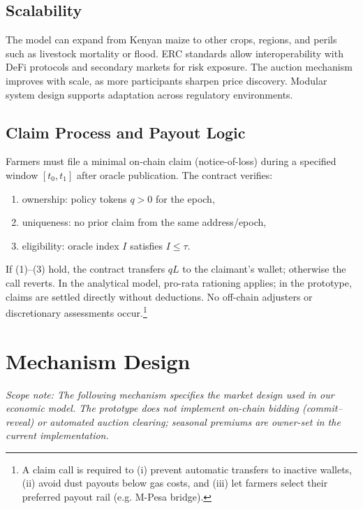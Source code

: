 \documentclass[11pt,a4paper]{article}
\begin{document}
        \subsection{Scalability}\label{subsec:scalability}
        The model can expand from Kenyan maize to other crops, regions, and perils such as livestock mortality or flood.
        ERC standards allow interoperability with DeFi protocols and secondary markets for risk exposure.
        The auction mechanism improves with scale, as more participants sharpen price discovery.
        Modular system design supports adaptation across regulatory environments.

        \subsection{Claim Process and Payout Logic}\label{subsec:claim-process-and-payout-logic}
        Farmers must file a minimal on-chain claim (notice-of-loss) during a specified window $[t_0,t_1]$ after oracle publication.
        The contract verifies:
        \begin{enumerate}
            \item ownership: policy tokens $q>0$ for the epoch,
            \item uniqueness: no prior claim from the same address/epoch,
            \item eligibility: oracle index $I$ satisfies $I \le \tau$.
        \end{enumerate}
        If (1)--(3) hold, the contract transfers $qL$ to the claimant’s wallet; otherwise the call reverts.
        In the analytical model, pro-rata rationing applies; in the prototype, claims are settled directly without deductions.
        No off-chain adjusters or discretionary assessments occur.\footnote{A claim call is required to (i) prevent automatic transfers to inactive wallets, (ii) avoid dust payouts below gas costs, and (iii) let farmers select their preferred payout rail (e.g. M-Pesa bridge).}

        \section{Mechanism Design}\label{sec:mechanism-design}

        \noindent\textit{Scope note: The following mechanism specifies the market design used in our economic model. The prototype does not implement on-chain bidding (commit--reveal) or automated auction clearing; seasonal premiums are owner-set in the current implementation.}
\end{document}
